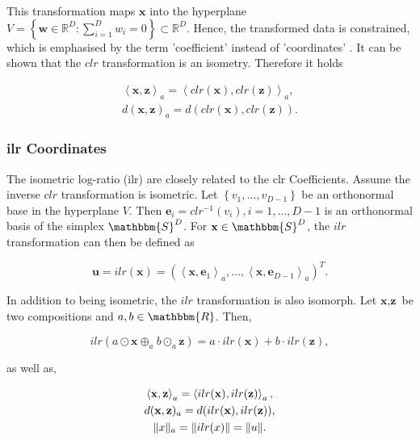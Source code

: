 This transformation maps $\textbf{x}$ into the hyperplane $V = \left\{\textbf{w} \in \mathbb{R}^D: \sum_{i=1}^D w_i=0\right\} \subset \mathbb{R}^D$. Hence, the transformed data is constrained, which is emphasised by the term 'coefficient' instead of 'coordinates' \cite{Filzmoser:2020}. It can be shown that the $clr$ transformation is an isometry\cite{Egozcue:2003}. Therefore it holds 

\begin{gather}
\left\langle  \textbf{x},\textbf{z} \right\rangle_a = \left\langle  clr(\textbf{x}),clr(\textbf{z}) \right\rangle_a, \\
d(\textbf{x},\textbf{z})_a = d(clr(\textbf{x}),clr(\textbf{z})).
\label{eq:clr Coefficients isometric}
\end{gather}

\subsubsection{ilr Coordinates}
\label{sec:ilr Coordinates}

The isometric log-ratio (ilr) are closely related to the clr Coefficients. Assume the inverse $clr$ transformation is isometric. Let $\left\{v_1,\ldots,v_{D-1}\right\}$ be an orthonormal base in the hyperplane $V$. Then $\textbf{e}_i = clr^{-1}(v_i), i=1,\ldots,D-1$ is an orthonormal basis of the simplex $\mathbbm{S}^D$. For $\textbf{x} \in \mathbbm{S}^D$, the $ilr$ transformation can then be defined as \cite{Kynclova:2015}

\begin{equation}
\textbf{u} = ilr(\textbf{x}) = \left(\left\langle \textbf{x},\textbf{e}_1\right\rangle_a,\ldots,\left\langle \textbf{x},\textbf{e}_{D-1}\right\rangle_a\right)^T.
\label{eq:ilr Coordinates}
\end{equation}

In addition to being isometric, the $ilr$ transformation is also isomorph. Let $\textbf{x}, \textbf{z}$ be two compositions and $a, b  \in \mathbbm{R}$. Then,

\begin{equation}
ilr(a \odot \textbf{x} \oplus_a b \odot_a \textbf{z}) = a \cdot ilr(\textbf{x}) + b \cdot ilr(\textbf{z}),
\label{eq:ilr coordinates isomorph}
\end{equation}

as well as,

\begin{gather}
\left\langle  \textbf{x},\textbf{z} \right\rangle_a = \left\langle  ilr(\textbf{x}), ilr(\textbf{z}) \right\rangle_a, \\
d(\textbf{x},\textbf{z})_a = d(ilr(\textbf{x}),ilr(\textbf{z})),\\
\lVert x\rVert_a = \lVert ilr(x)\rVert = \lVert u\rVert.
\label{eq:ilr coordinates isometric }
\end{gather}


